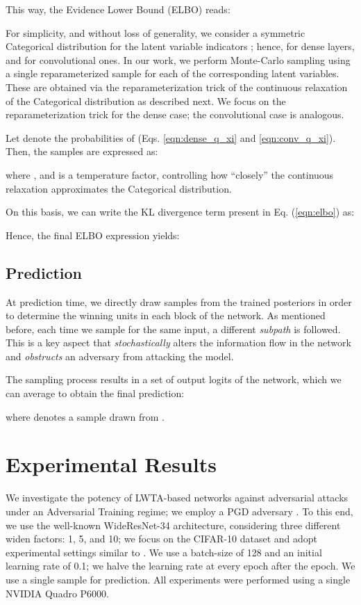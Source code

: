 \documentclass{article}
\begin{document}
	This way, the Evidence Lower Bound (ELBO) reads:
	 
For simplicity, and without loss of generality, we consider a symmetric Categorical distribution for the latent variable indicators ; hence,   for dense layers, and  for convolutional ones. In our work, we perform Monte-Carlo sampling using a single reparameterized sample for each of the corresponding latent variables. These are obtained via the reparameterization trick of the continuous relaxation of the Categorical distribution \citep{maddison, jang} as described next. We focus on the reparameterization trick for the dense case; the convolutional case is analogous.
	
	Let  denote the probabilities of  (Eqs. \eqref{eqn:dense_q_xi} and \eqref{eqn:conv_q_xi}). Then, the samples  are expressed as:

	where , and  is a temperature factor, controlling how ``closely'' the continuous relaxation approximates the Categorical distribution. 


	On this basis, we can write the KL divergence term present in Eq. (\ref{eqn:elbo}) as:

	Hence, the final ELBO expression yields:
	
	
	\subsection{Prediction}
	
	At prediction time, we directly draw  samples from the trained posteriors  in order to determine the winning units in each block of the network. As mentioned before, each time we sample for the same input, a different \textit{subpath} is followed.  This is a key aspect that \textit{stochastically} alters the information flow in the network and \textit{obstructs} an adversary from attacking the model. 
	
	The sampling process results in a set of  output logits of the network, which we can average to obtain the final prediction:

    where  denotes a sample drawn from  . 
\section{Experimental Results}
	
	We investigate the potency of LWTA-based networks against adversarial attacks under an Adversarial Training regime; we employ a PGD adversary \citep{madry2017towards}. To this end, we use the well-known WideResNet-34 \citep{wideresnet} architecture, considering three different widen factors: 1, 5, and 10; we focus on the CIFAR-10 dataset and adopt experimental settings similar to \cite{wu2021wider}. We use a batch-size of 128 and an initial learning rate of 0.1; we halve the learning rate at every epoch after the  epoch. We use a single sample  for prediction. All experiments were performed using a single NVIDIA Quadro P6000.
	
\end{document}
